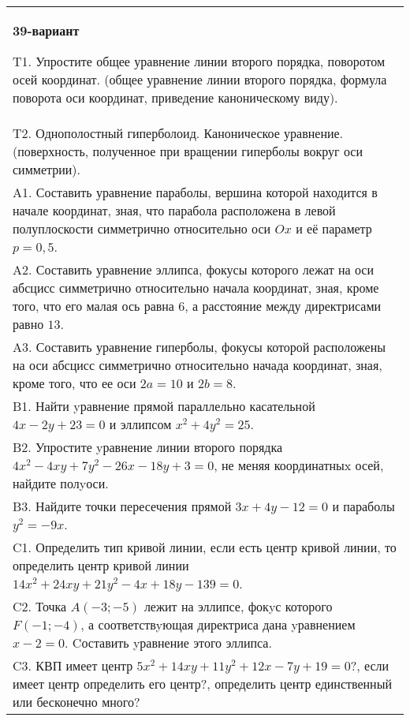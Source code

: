 \documentclass{article}
\begin{document}
\begin{tabular}{m{17cm}}
\textbf{39-вариант}
\newline

T1. Упростите общее уравнение линии второго порядка, поворотом осей координат. (общее уравнение линии второго порядка, формула поворота оси координат, приведение каноническому виду).\\

T2. Однополостный гиперболоид. Каноническое уравнение. (поверхность, полученное при вращении гиперболы вокруг оси симметрии).\\

A1. Составить уравнение параболы, вершина которой находится в начале координат, зная, что парабола расположена в левой полуплоскости симметрично относительно оси $Ox$ и её параметр $p=0,5$.\\

A2. Составить уравнение эллипса, фокусы которого лежат на оси абсцисс симметрично относительно начала координат, зная, кроме того, что его малая ось равна $6$, а расстояние между директрисами равно $13$.\\

A3. Составить уравнение гиперболы, фокусы которой расположены на оси абсцисс симметрично относительно начада координат, зная, кроме того, что ее оси $2a=10$ и $2b=8$.\\

B1. Найти yравнение прямой параллельно касательной $4x - 2y + 23 = 0$ и эллипсом $x^{2} + 4y^{2} = 25$.  \\

B2. Упростите yравнение линии второго порядка $4x^{2} - 4xy + 7y^{2} - 26x - 18y + 3 = 0$, не меняя координатныx осей, найдите полyоси.\\

B3. Найдите точки пересечения прямой $3x + 4y - 12 = 0$ и параболы $y^{2} = - 9x$.  \\

C1. Определить тип кривой линии, если есть центр кривой линии, то определить центр кривой линии $14x^{2}+24xy+21y^{2}-4x+18y-139=0$.  \\

C2. Точка $A(-3;-5)$ лежит на эллипсе, фокyс которого $F(-1;-4)$, а соответствyющая директриса дана yравнением $x-2=0$. Cоставить yравнение этого эллипса.  \\

C3. КВП имеет центр $5x^{2}+14xy+11y^{2}+12x-7y+19=0$?, если имеет центр определить его центр?, определить центр единственный или бесконечно много?  \\

\end{tabular}
\vspace{1cm}
\end{document}
